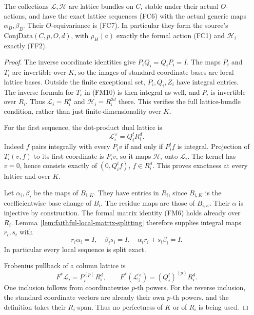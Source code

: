 \begin{srproposition}\label{prop:faithful-family-two-exact}
The collections \(\mathcal L,\mathcal H\) are lattice
bundles on \(C\), stable under their actual \(O\)-actions,
and have the exact lattice sequences (FC6) with the
actual generic maps \(\alpha_B,\beta_B\).
Their \(O\)-equivariance is (FC7).
In particular they form the source's
\(\mathrm{ConjData}(C,p,O,d)\), with
\(\rho_H(a)\) exactly the formal action (FC1) and
\(\mathcal H_i\) exactly (FF2).
\end{srproposition}
\begin{proof}
The inverse coordinate identities give \(P_iQ_i=Q_iP_i=I\).
The maps \(P_i\) and \(T_i\) are invertible over \(K\),
so the images of standard coordinate bases are local
lattice bases.
Outside the finite exceptional set, \(P_i,Q_i,Z_i\)
have integral entries.
The inverse formula for \(T_i\) in (FM10) is then integral
as well, and \(P_i\) is invertible over \(R_i\).
Thus \(\mathcal L_i=R_i^d\) and
\(\mathcal H_i=R_i^{2d}\) there.
This verifies the full lattice-bundle condition,
rather than just finite-dimensionality over \(K\).

For the first sequence, the dot-product dual lattice is
\[
                         \mathcal L_i^\vee=Q_i^tR_i^d.
\]
Indeed \(f\) pairs integrally with every \(P_iv\)
if and only if \(P_i^tf\) is integral.
Projection of \(T_i(v,f)\) to its first coordinate is
\(P_iv\), so it maps \(\mathcal H_i\) onto
\(\mathcal L_i\).
The kernel has \(v=0\), hence consists exactly of
\((0,Q_i^tf)\), \(f\in R_i^d\).
This proves exactness at every lattice and over \(K\).

Let \(\alpha_i,\beta_i\) be the maps of \(B_{i,K}\).
They have entries in \(R_i\), since \(B_{i,K}\) is
the coefficientwise base change of \(B_i\).
The residue maps are those of \(B_{i,\kappa}\).
Their \(\alpha\) is injective by construction.
The formal matrix identity (FM6) holds already over
\(R_i\).
Lemma~\ref{lem:faithful-local-matrix-splitting} therefore
supplies integral maps \(r_i,s_i\) with
\[
              r_i\alpha_i=I,\quad \beta_i s_i=I,\quad
                       \alpha_i r_i+s_i\beta_i=I.
 \tag{FF3}\label{eq:faithful-actual-local-split}
\]
In particular every local sequence is split exact.

Frobenius pullback of a column lattice is
\[
                F^*\mathcal L_i=P_i^{(p)}R_i^d,\qquad
 F^*(\mathcal L_i^\vee)=(Q_i^t)^{(p)}R_i^d .
 \tag{FF4}\label{eq:faithful-frobenius-column-lattice}
\]
One inclusion follows from coordinatewise \(p\)-th powers.
For the reverse inclusion, the standard coordinate
vectors are already their own \(p\)-th powers, and the
definition takes their \(R_i\)-span.
Thus no perfectness of \(K\) or of \(R_i\) is being used.


\end{proof}
